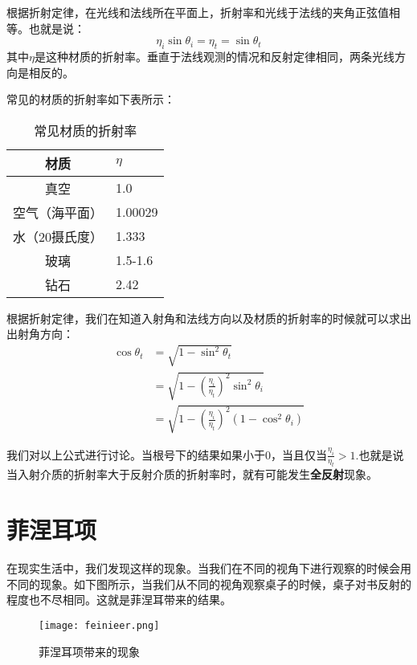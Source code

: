 \documentclass[openany]{progbookcn}
\begin{document}
根据折射定律，在光线和法线所在平面上，折射率和光线于法线的夹角正弦值相等。也就是说：
\begin{equation}
	\eta_i\sin\theta_i = \eta_t=\sin\theta_t
\end{equation}
其中$\eta$是这种材质的折射率。垂直于法线观测的情况和反射定律相同，两条光线方向是相反的。

常见的材质的折射率如下表所示：

\begin{table}[H]
	\centering
	\begin{tabular}{cl}
		\hline
		材质       & $\eta$  \\ \hline
		真空       & 1.0     \\
		空气（海平面）  & 1.00029 \\
		水（20摄氏度） & 1.333   \\
		玻璃       & 1.5-1.6 \\
		钻石       & 2.42  \\ \hline
	\end{tabular}
	\caption{常见材质的折射率}
\end{table}

根据折射定律，我们在知道入射角和法线方向以及材质的折射率的时候就可以求出出射角方向：
\begin{equation}
	\begin{split}
		\cos\theta_t&=\sqrt{1-\sin^2\theta_t}\\
		&=\sqrt{1-(\frac{\eta_i}{\eta_t})^2\sin^2\theta_i}\\
		&=\sqrt{1-(\frac{\eta_i}{\eta_t})^2(1-\cos^2\theta_i)}
	\end{split}
\end{equation}

我们对以上公式进行讨论。当根号下的结果如果小于0，当且仅当$\frac{\eta_i}{\eta_t}>1$.也就是说当入射介质的折射率大于反射介质的折射率时，就有可能发生\textbf{全反射}现象。

\section{菲涅耳项}

在现实生活中，我们发现这样的现象。当我们在不同的视角下进行观察的时候会用不同的现象。如下图所示，当我们从不同的视角观察桌子的时候，桌子对书反射的程度也不尽相同。这就是菲涅耳带来的结果。

\begin{figure}[H]
	\centering
	\texttt{[image: feinieer.png]}
	\caption{菲涅耳项带来的现象}
	\label{fig:fne}
\end{figure}
\end{document}
